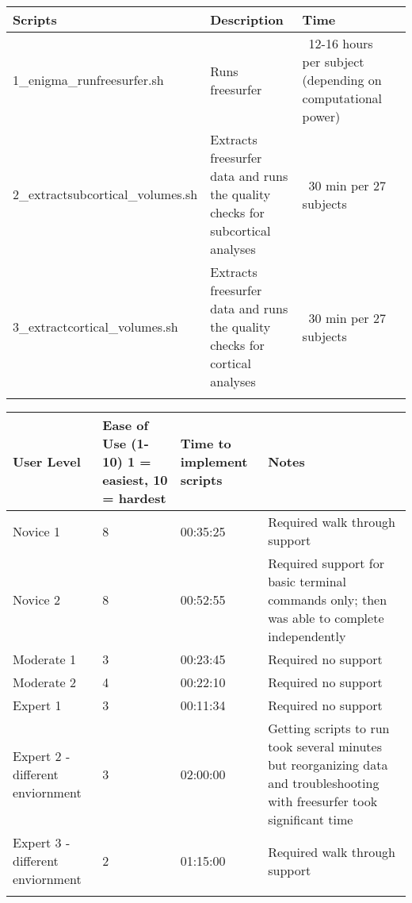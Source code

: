 \documentclass[twocolumn]{bmcart}%
\begin{document}
\begin{table*}
  \begin{tabular*}{\textwidth}{p{3cm}p{2cm}p{4cm}p{6cm}}
    Scripts  & Description  &  Time \\
      \hline\noalign{\smallskip}
      1_enigma_runfreesurfer.sh     &    Runs freesurfer      &    ~12-16 hours per subject (depending on computational power)    \\
      2_extractsubcortical_volumes.sh     &    Extracts freesurfer data and runs the quality checks for subcortical analyses      &    ~30 min per 27 subjects   \\
      3_extractcortical_volumes.sh     &    Extracts freesurfer data and runs the quality checks for cortical analyses     &     ~30 min per 27 subjects   \\
      \noalign{\smallskip}\hline
\end{tabular*}
\end{table*}

\begin{table*}
\begin{tabular*}{\textwidth}{p{3cm}p{2cm}p{4cm}p{6cm}}
  User Level  & Ease of Use (1-10) 1 = easiest, 10 = hardest & Time to implement scripts & Notes \\
    \hline\noalign{\smallskip}
  Novice 1     &     8     &     00:35:25     &     Required walk through support   \\
  Novice 2     &     8     &     00:52:55     &     Required support for basic terminal commands only; then was able to complete independently   \\
  Moderate 1     &     3     &     00:23:45     &     Required no support   \\
  Moderate 2     &     4     &     00:22:10     &     Required no support   \\
  Expert 1     &     3     &     00:11:34     &     Required no support   \\
  Expert 2 - different enviornment     &     3     &     02:00:00     &     Getting scripts to run took several minutes but reorganizing data and troubleshooting with freesurfer took significant time   \\ 
  Expert 3 - different enviornment     &     2     &     01:15:00     &     Required walk through support   \\ 
  \noalign{\smallskip}\hline
\end{tabular*}
\end{table*}

\end{document}
